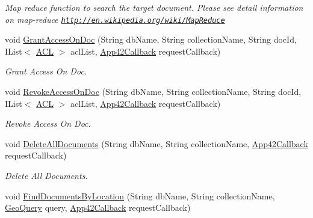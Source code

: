 \begin{DoxyCompactItemize}
\begin{DoxyCompactList}\small\item\em Map reduce function to search the target document. Please see detail information on map-\/reduce \href{http://en.wikipedia.org/wiki/MapReduce}{\tt http\+://en.\+wikipedia.\+org/wiki/\+Map\+Reduce} \end{DoxyCompactList}\item 
void \hyperlink{classcom_1_1shephertz_1_1app42_1_1paas_1_1sdk_1_1windows_1_1storage_1_1_storage_service_aef5c978fe0491633c2eaa45c72d89f17}{Grant\+Access\+On\+Doc} (String db\+Name, String collection\+Name, String doc\+Id, I\+List$<$ \hyperlink{classcom_1_1shephertz_1_1app42_1_1paas_1_1sdk_1_1windows_1_1_a_c_l}{A\+C\+L} $>$ acl\+List, \hyperlink{interfacecom_1_1shephertz_1_1app42_1_1paas_1_1sdk_1_1windows_1_1_app42_callback}{App42\+Callback} request\+Callback)
\begin{DoxyCompactList}\small\item\em Grant Access On Doc. \end{DoxyCompactList}\item 
void \hyperlink{classcom_1_1shephertz_1_1app42_1_1paas_1_1sdk_1_1windows_1_1storage_1_1_storage_service_ac641842a19024a372dfda2b34d61ddf6}{Revoke\+Access\+On\+Doc} (String db\+Name, String collection\+Name, String doc\+Id, I\+List$<$ \hyperlink{classcom_1_1shephertz_1_1app42_1_1paas_1_1sdk_1_1windows_1_1_a_c_l}{A\+C\+L} $>$ acl\+List, \hyperlink{interfacecom_1_1shephertz_1_1app42_1_1paas_1_1sdk_1_1windows_1_1_app42_callback}{App42\+Callback} request\+Callback)
\begin{DoxyCompactList}\small\item\em Revoke Access On Doc. \end{DoxyCompactList}\item 
void \hyperlink{classcom_1_1shephertz_1_1app42_1_1paas_1_1sdk_1_1windows_1_1storage_1_1_storage_service_a11f65923377158b1bc9c76572431818d}{Delete\+All\+Documents} (String db\+Name, String collection\+Name, \hyperlink{interfacecom_1_1shephertz_1_1app42_1_1paas_1_1sdk_1_1windows_1_1_app42_callback}{App42\+Callback} request\+Callback)
\begin{DoxyCompactList}\small\item\em Delete All Documents. \end{DoxyCompactList}\item 
void \hyperlink{classcom_1_1shephertz_1_1app42_1_1paas_1_1sdk_1_1windows_1_1storage_1_1_storage_service_a32d1aa5d95d11f5fea4ccabbd0695c52}{Find\+Documents\+By\+Location} (String db\+Name, String collection\+Name, \hyperlink{classcom_1_1shephertz_1_1app42_1_1paas_1_1sdk_1_1windows_1_1storage_1_1_geo_query}{Geo\+Query} query, \hyperlink{interfacecom_1_1shephertz_1_1app42_1_1paas_1_1sdk_1_1windows_1_1_app42_callback}{App42\+Callback} request\+Callback)

\end{DoxyCompactItemize}
